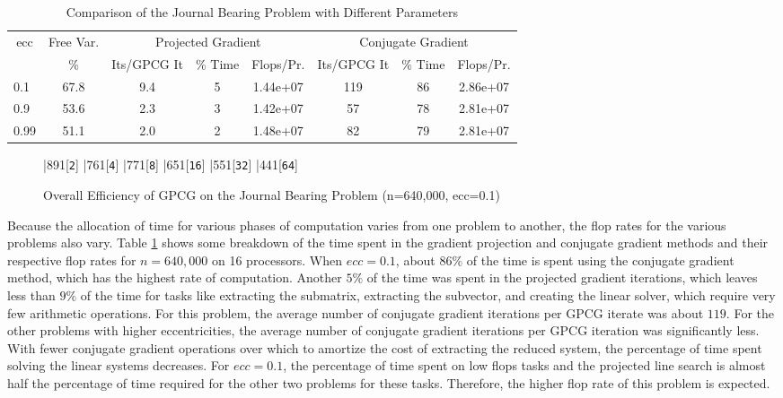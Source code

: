 \begin{table}[h]
\small
\begin{center}
\begin{tabular}{|lc|ccc|ccc|}
\hline
\multicolumn{1}{|c}{ecc} &
\multicolumn{1}{c|}{Free Var.} &
\multicolumn{3}{c|}{Projected Gradient} &
\multicolumn{3}{c|}{Conjugate Gradient} \\
& \% &
Its/GPCG It & \% Time &Flops/Pr. &
Its/GPCG It & \% Time &Flops/Pr. \\
\hline
0.1 & 67.8 & 9.4 & 5 & 1.44e+07 & 119 & 86 & 2.86e+07 \\
0.9 & 53.6 & 2.3 & 3 & 1.42e+07 & 57 &  78 & 2.81e+07 \\
0.99 & 51.1 & 2.0 & 2 & 1.48e+07 & 82 &  79 & 2.81e+07  \\
\hline
\end{tabular}
\label{problem-differences}
\caption{Comparison of the Journal Bearing Problem with Different Parameters}
\end{center}
\end{table}


\begin{figure}
\caption{Overall Efficiency of GPCG on the Journal Bearing Problem (n=640,000, ecc=0.1)}
\begin{center}
\begin{barenv}
\setyname{\%}
\bar{89}{1}[\texttt{2}]
\bar{76}{1}[\texttt{4}]
\bar {77}{1}[\texttt{8}]
\bar{65}{1}[\texttt{16}]
\bar{55}{1}[\texttt{32}]
\bar{44}{1}[\texttt{64}]
\end{barenv}
\end{center}
\end{figure}

Because the allocation of time for various phases of computation
varies from one problem to another,
the flop rates for the various problems also vary.
Table \ref{problem-differences} shows some
breakdown of the time spent in the gradient projection
and conjugate gradient methods and their respective flop
rates for $n=640,000$ on 16 processors.   When $ecc = 0.1$,
about $86\%$ of the time is spent using the conjugate gradient
method, which has the highest rate of computation.
Another $5\%$ of the time was spent in the projected gradient
iterations, which leaves less than $9\%$ of the time for
tasks like extracting the submatrix, extracting the subvector,
and creating the linear solver, which require very few arithmetic
operations. For this problem,
the average number of conjugate gradient iterations per
GPCG iterate was about $119$.  For the other problems with higher eccentricities,
the average number of conjugate gradient iterations per
GPCG iteration was significantly less.
With fewer conjugate gradient operations over which to
amortize the cost of extracting the reduced system,
the percentage of time spent solving the linear systems decreases.
For  $ecc=0.1$, the percentage of time spent on low flops tasks
and the projected line search is almost half the percentage of time
required for the other two problems for these tasks.  Therefore, the
higher flop rate of this problem is expected.

